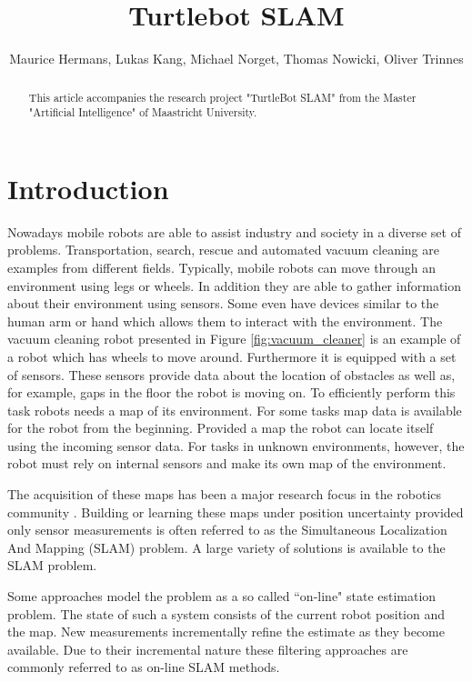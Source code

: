 \documentclass{ba-kecs}
\title{Turtlebot SLAM }
\author{Maurice Hermans, Lukas Kang, Michael Norget, Thomas Nowicki, Oliver Trinnes}
\begin{document}
\maketitle

\begin{abstract}
This article accompanies the research project "TurtleBot SLAM" from the Master "Artificial Intelligence" of Maastricht University.
\end{abstract}

\section{Introduction}
\label{sec:intro}
Nowadays mobile robots are able to assist industry and society in a diverse set of problems. Transportation, search, rescue and automated vacuum cleaning are examples from different fields. Typically, mobile robots can move through an environment using legs or wheels. In addition they are able to gather information about their environment using sensors. Some even have devices similar to the human arm or hand which allows them to interact with the environment. The vacuum cleaning robot presented in Figure \ref{fig:vacuum_cleaner} is an example of a robot which has wheels to move around. Furthermore it is equipped with a set of sensors. These sensors provide data about the location of obstacles as well as, for example, gaps in the floor the robot is moving on. To efficiently perform this task robots needs a map of its environment. For some tasks map data is available for the robot from the beginning. Provided a map the robot can locate itself using the incoming sensor data. For tasks in unknown environments, however, the robot must rely on internal sensors and make its own map of the environment.

The acquisition of these maps has been a major research focus in the robotics community \cite{Thrun, Grisetti, Montemerlo02, Montemerlo}. Building or learning these maps under position uncertainty provided only sensor measurements is often referred to as the Simultaneous Localization And Mapping (SLAM) problem. A large variety of solutions is available to the SLAM problem.

Some approaches model the problem as a so called ``on-line" state estimation problem. The state of such a system consists of the current robot position and the map. New measurements incrementally refine the estimate as they become available. Due to their incremental nature these filtering approaches are commonly referred to as on-line SLAM methods. 
\end{document}
